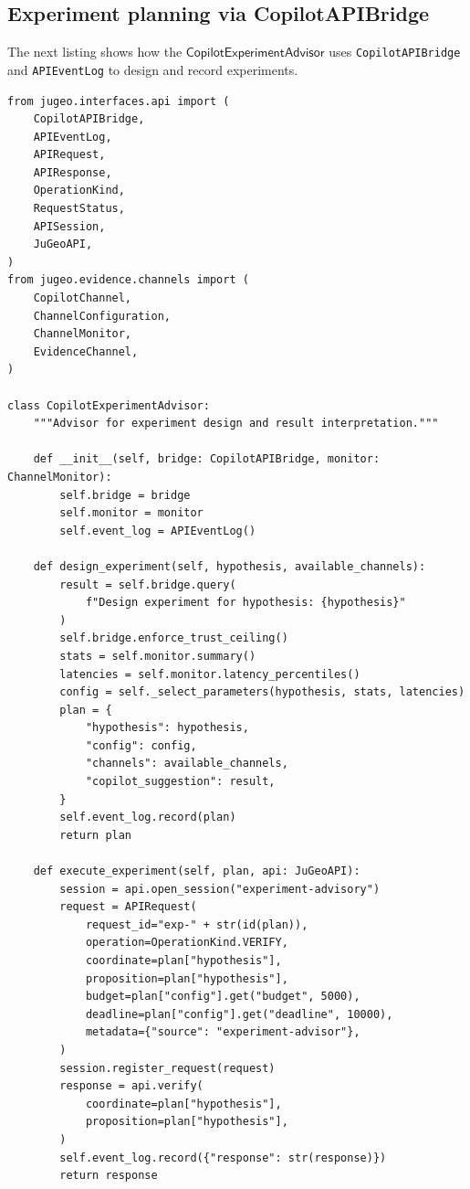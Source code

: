 \documentclass[11pt]{article}
\newcommand{\ExpAdv}{\mathsf{CopilotExperimentAdvisor}}
\begin{document}
\subsection{Experiment planning via CopilotAPIBridge}

The next listing shows how the $\ExpAdv$ uses
\texttt{CopilotAPIBridge} and \texttt{APIEventLog}
to design and record experiments.

\begin{lstlisting}[style=jugeo-python,
  caption={Experiment planning with CopilotAPIBridge},
  label={lst:expplan}]
from jugeo.interfaces.api import (
    CopilotAPIBridge,
    APIEventLog,
    APIRequest,
    APIResponse,
    OperationKind,
    RequestStatus,
    APISession,
    JuGeoAPI,
)
from jugeo.evidence.channels import (
    CopilotChannel,
    ChannelConfiguration,
    ChannelMonitor,
    EvidenceChannel,
)

class CopilotExperimentAdvisor:
    """Advisor for experiment design and result interpretation."""

    def __init__(self, bridge: CopilotAPIBridge, monitor: ChannelMonitor):
        self.bridge = bridge
        self.monitor = monitor
        self.event_log = APIEventLog()

    def design_experiment(self, hypothesis, available_channels):
        result = self.bridge.query(
            f"Design experiment for hypothesis: {hypothesis}"
        )
        self.bridge.enforce_trust_ceiling()
        stats = self.monitor.summary()
        latencies = self.monitor.latency_percentiles()
        config = self._select_parameters(hypothesis, stats, latencies)
        plan = {
            "hypothesis": hypothesis,
            "config": config,
            "channels": available_channels,
            "copilot_suggestion": result,
        }
        self.event_log.record(plan)
        return plan

    def execute_experiment(self, plan, api: JuGeoAPI):
        session = api.open_session("experiment-advisory")
        request = APIRequest(
            request_id="exp-" + str(id(plan)),
            operation=OperationKind.VERIFY,
            coordinate=plan["hypothesis"],
            proposition=plan["hypothesis"],
            budget=plan["config"].get("budget", 5000),
            deadline=plan["config"].get("deadline", 10000),
            metadata={"source": "experiment-advisor"},
        )
        session.register_request(request)
        response = api.verify(
            coordinate=plan["hypothesis"],
            proposition=plan["hypothesis"],
        )
        self.event_log.record({"response": str(response)})
        return response


\end{lstlisting}
\end{document}

